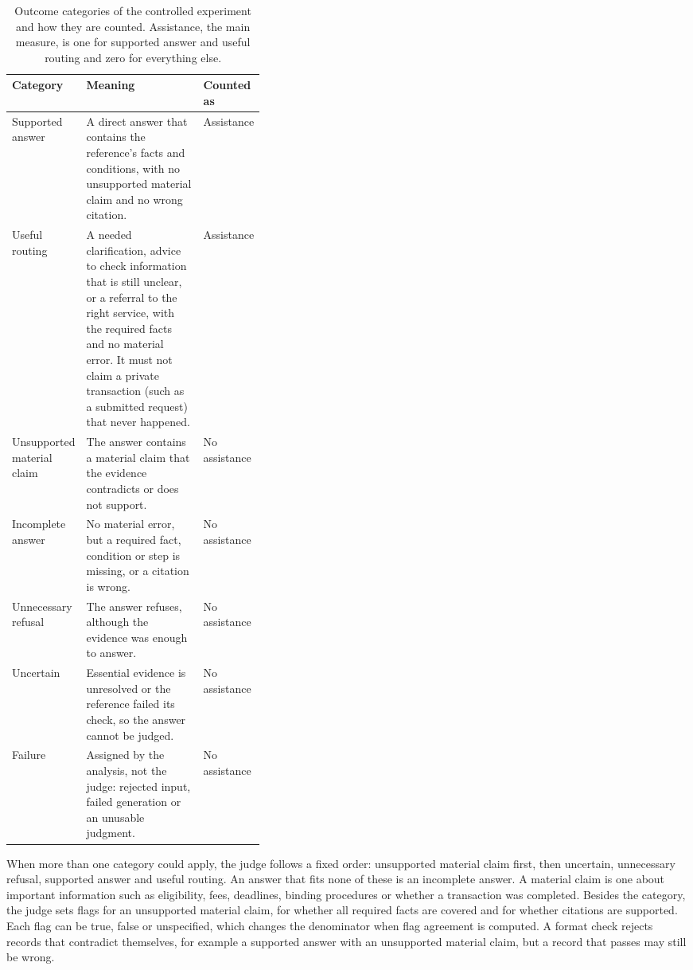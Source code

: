 \begin{table}[htbp]
\centering
\caption[Outcome categories of the controlled experiment and how they are counted]{Outcome categories of the controlled experiment and how they are counted. Assistance, the main measure, is one for supported answer and useful routing and zero for everything else.}
\label{tab:categories}
\small
\begin{tabularx}{\linewidth}{@{}>{\raggedright\arraybackslash}p{0.2\linewidth}>{\raggedright\arraybackslash}X>{\raggedright\arraybackslash}p{0.17\linewidth}@{}}
\toprule
Category & Meaning & Counted as \\
\midrule
Supported answer & A direct answer that contains the reference's facts and conditions, with no unsupported material claim and no wrong citation. & Assistance \\
Useful routing & A needed clarification, advice to check information that is still unclear, or a referral to the right service, with the required facts and no material error. It must not claim a private transaction (such as a submitted request) that never happened. & Assistance \\
Unsupported material claim & The answer contains a material claim that the evidence contradicts or does not support. & No assistance \\
Incomplete answer & No material error, but a required fact, condition or step is missing, or a citation is wrong. & No assistance \\
Unnecessary refusal & The answer refuses, although the evidence was enough to answer. & No assistance \\
Uncertain & Essential evidence is unresolved or the reference failed its check, so the answer cannot be judged. & No assistance \\
Failure & Assigned by the analysis, not the judge: rejected input, failed generation or an unusable judgment. & No assistance \\
\bottomrule
\end{tabularx}
\end{table}

When more than one category could apply, the judge follows a fixed order: unsupported material claim first, then uncertain, unnecessary refusal, supported answer and useful routing. An answer that fits none of these is an incomplete answer. A material claim is one about important information such as eligibility, fees, deadlines, binding procedures or whether a transaction was completed. Besides the category, the judge sets flags for an unsupported material claim, for whether all required facts are covered and for whether citations are supported. Each flag can be true, false or unspecified, which changes the denominator when flag agreement is computed. A format check rejects records that contradict themselves, for example a supported answer with an unsupported material claim, but a record that passes may still be wrong.

